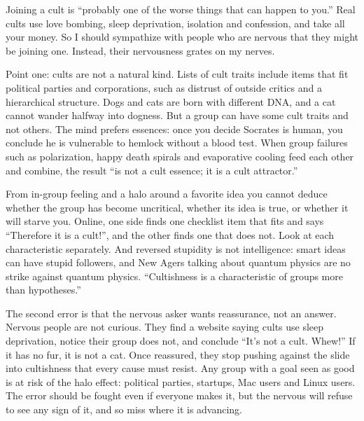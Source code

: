 
Joining a cult is ``probably one of the worse things that can happen to you.'' Real cults use love bombing, sleep deprivation, isolation and confession, and take all your money. So I should sympathize with people who are nervous that they might be joining one. Instead, their nervousness grates on my nerves.

Point one: cults are not a natural kind. Lists of cult traits include items that fit political parties and corporations, such as distrust of outside critics and a hierarchical structure. Dogs and cats are born with different DNA, and a cat cannot wander halfway into dogness. But a group can have some cult traits and not others. The mind prefers essences: once you decide Socrates is human, you conclude he is vulnerable to hemlock without a blood test. When group failures such as polarization, happy death spirals and evaporative cooling feed each other and combine, the result ``is not a cult essence; it is a cult attractor.''

From in-group feeling and a halo around a favorite idea you cannot deduce whether the group has become uncritical, whether its idea is true, or whether it will starve you. Online, one side finds one checklist item that fits and says ``Therefore it is a cult!'', and the other finds one that does not. Look at each characteristic separately. And reversed stupidity is not intelligence: smart ideas can have stupid followers, and New Agers talking about quantum physics are no strike against quantum physics. ``Cultishness is a characteristic of groups more than hypotheses.'' 

The second error is that the nervous asker wants reassurance, not an answer. Nervous people are not curious. They find a website saying cults use sleep deprivation, notice their group does not, and conclude ``It's not a cult. Whew!'' If it has no fur, it is not a cat. Once reassured, they stop pushing against the slide into cultishness that every cause must resist. Any group with a goal seen as good is at risk of the halo effect: political parties, startups, Mac users and Linux users. The error should be fought even if everyone makes it, but the nervous will refuse to see any sign of it, and so miss where it is advancing. 


